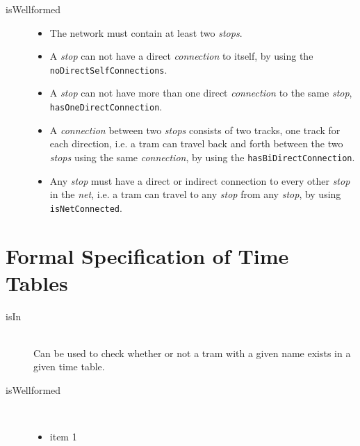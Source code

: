 \documentclass[a4]{article}
\begin{document}
\begin{description}
    \item[isWellformed] \hfill
        \begin{itemize}
            \item The network must contain at least two \emph{stops}.
            \item A \emph{stop} can not have a direct \emph{connection} to itself, by using the \verb=noDirectSelfConnections=.
            \item A \emph{stop} can not have more than one direct \emph{connection} to the same \emph{stop}, \verb=hasOneDirectConnection=.
            \item A \emph{connection} between two \emph{stops} consists of two tracks, one track for each direction, i.e. a tram can travel back and forth between the two \emph{stops} using the same \emph{connection}, by using the \verb=hasBiDirectConnection=.
            \item Any \emph{stop} must have a direct or indirect connection to every other \emph{stop} in the \emph{net}, i.e. a tram can travel to any \emph{stop} from any \emph{stop}, by using \verb=isNetConnected=.
        \end{itemize}
\end{description}

\section{Formal Specification of Time Tables}



\begin{description}
    \item[isIn] \hfill \\ Can be used to check whether or not a tram with a given name exists in a given time table.
    \item[isWellformed] \hfill \\ 
        \begin{itemize}
            \item item 1
        \end{itemize}
\end{description}
\end{document}
